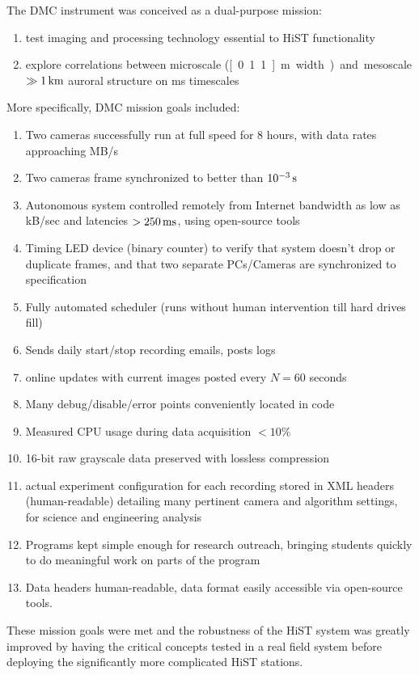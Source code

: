 The DMC instrument was conceived as a dual-purpose mission:
\begin{enumerate}
    \item test imaging and processing technology essential to HiST functionality
    \item explore correlations between microscale (\unit[0.1..1]{m} width) and mesoscale $\gg \unit[1]{km}$ auroral structure on \unit[20]{ms} timescales
\end{enumerate}
More specifically, DMC mission goals included:
\begin{enumerate}
	\item Two cameras successfully run at full speed for 8 hours, with data rates approaching \unit[500]{MB/s}
	\item Two cameras frame synchronized to better than $\unit[10^{-3}]{s}$
	\item Autonomous system controlled remotely from Internet bandwidth as low as \unit[5]{kB/sec} and latencies $ > \unit[250]{ms}$, using open-source tools
	\item Timing LED device (binary counter) to verify that system doesn't drop or duplicate frames, and that two separate PCs/Cameras are synchronized to specification
	\item Fully automated scheduler (runs without human intervention till hard drives fill)
    \item Sends daily start/stop recording emails, posts logs
	\item online updates with current images posted every $N=60$ seconds
    \item Many debug/disable/error points conveniently located in code
	\item Measured CPU usage during data acquisition $< 10$\%
	\item 16-bit raw grayscale data preserved with lossless compression
	\item actual experiment configuration for each recording stored in XML headers (human-readable) detailing many pertinent camera and algorithm settings, for science and engineering analysis
	\item Programs kept simple enough for research outreach, bringing students quickly to do meaningful work on parts of the program
	\item Data headers human-readable, data format easily accessible via open-source tools.
\end{enumerate}
These mission goals were met and the robustness of the HiST system was greatly improved by having the critical concepts tested in a real field system before deploying the significantly more complicated HiST stations.

